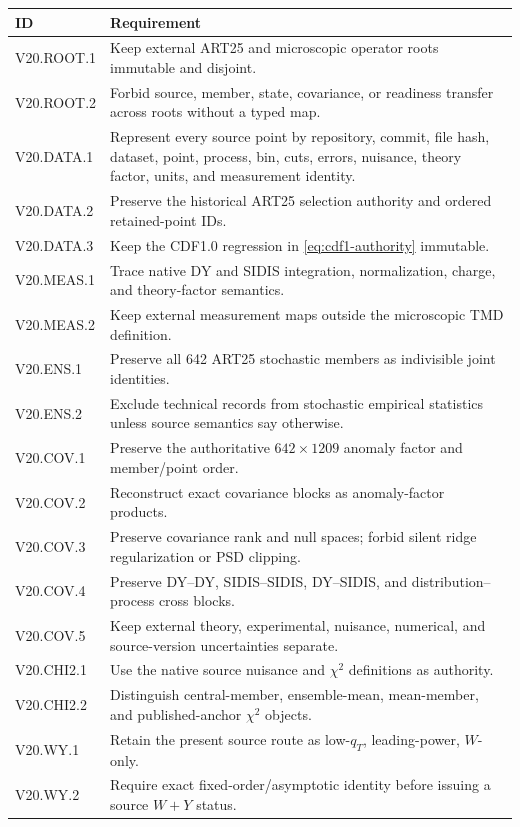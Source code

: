 \documentclass[11pt]{article}
\begin{document}
\begin{longtable}{L{0.19\textwidth}L{0.72\textwidth}}
\toprule
ID & Requirement\\
\midrule
\endhead
V20.ROOT.1 & Keep external ART25 and microscopic operator roots immutable and disjoint.\\
V20.ROOT.2 & Forbid source, member, state, covariance, or readiness transfer across roots without a typed map.\\
V20.DATA.1 & Represent every source point by repository, commit, file hash, dataset, point, process, bin, cuts, errors, nuisance, theory factor, units, and measurement identity.\\
V20.DATA.2 & Preserve the historical ART25 selection authority and ordered retained-point IDs.\\
V20.DATA.3 & Keep the CDF1.0 regression in \cref{eq:cdf1-authority} immutable.\\
V20.MEAS.1 & Trace native DY and SIDIS integration, normalization, charge, and theory-factor semantics.\\
V20.MEAS.2 & Keep external measurement maps outside the microscopic TMD definition.\\
V20.ENS.1 & Preserve all 642 ART25 stochastic members as indivisible joint identities.\\
V20.ENS.2 & Exclude technical records from stochastic empirical statistics unless source semantics say otherwise.\\
V20.COV.1 & Preserve the authoritative \(642\times1209\) anomaly factor and member/point order.\\
V20.COV.2 & Reconstruct exact covariance blocks as anomaly-factor products.\\
V20.COV.3 & Preserve covariance rank and null spaces; forbid silent ridge regularization or PSD clipping.\\
V20.COV.4 & Preserve DY--DY, SIDIS--SIDIS, DY--SIDIS, and distribution--process cross blocks.\\
V20.COV.5 & Keep external theory, experimental, nuisance, numerical, and source-version uncertainties separate.\\
V20.CHI2.1 & Use the native source nuisance and \(\chi^2\) definitions as authority.\\
V20.CHI2.2 & Distinguish central-member, ensemble-mean, mean-member, and published-anchor \(\chi^2\) objects.\\
V20.WY.1 & Retain the present source route as low-\(q_T\), leading-power, \(W\)-only.\\
V20.WY.2 & Require exact fixed-order/asymptotic identity before issuing a source \(W+Y\) status.\\

\end{longtable}
\end{document}
